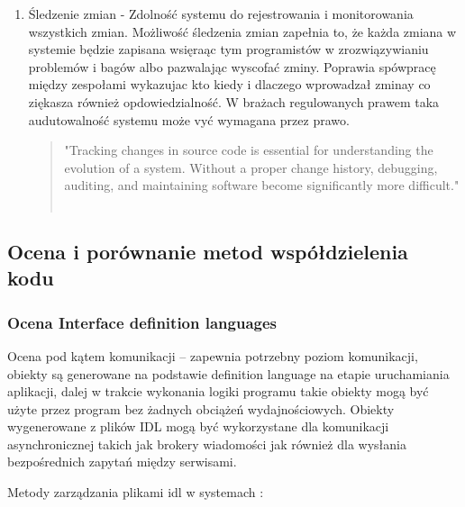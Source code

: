 \documentclass[runningheads,12pt]{llncs}
\begin{document}
\begin{enumerate}
    \item Śledzenie zmian - Zdolność systemu do rejestrowania i monitorowania wszystkich zmian. Możliwość śledzenia zmian zapełnia to, że każda zmiana w systemie będzie zapisana wsięraąc tym programistów w zrozwiązywianiu problemów i bagów albo pazwalając wyscofać zminy. Poprawia spówpracę między zespołami wykazujac kto kiedy i dlaczego wprowadzał zminay co ziękasza również opdowiedzialność. W brażach regulowanych prawem taka audutowalność systemu może vyć wymagana przez prawo. 
    \begin{quote}
        "Tracking changes in source code is essential for understanding the evolution of a system. Without a proper change history, debugging, auditing, and maintaining software become significantly more difficult." ~\cite[p. 150]{rubin2012essential}
    \end{quote}
\end{enumerate}

\subsection{Ocena i porównanie metod współdzielenia kodu}

\subsubsection{Ocena Interface definition languages}

Ocena pod kątem komunikacji – zapewnia potrzebny poziom komunikacji, obiekty są generowane na podstawie definition language na etapie uruchamiania aplikacji, dalej w trakcie wykonania logiki programu takie obiekty mogą być użyte przez program bez żadnych obciążeń wydajnościowych. Obiekty wygenerowane z plików IDL mogą być wykorzystane dla komunikacji asynchronicznej takich jak brokery wiadomości jak również dla wysłania bezpośrednich zapytań między serwisami.

Metody zarządzania plikami idl w systemach : 
\end{document}
